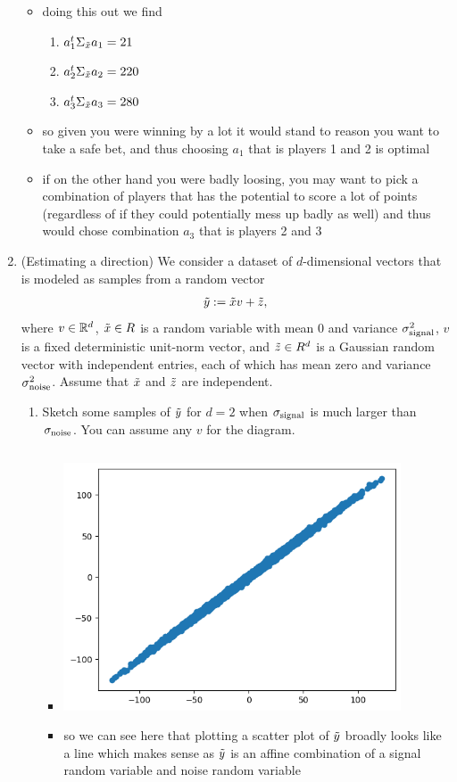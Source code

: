 \documentclass[12pt,twoside]{article}
\begin{document}
\begin{enumerate}
\begin{itemize}
\item doing this out we find 
\begin{enumerate}
  \item $a_{1}^t\Sigma_{\Tilde{x}}a_{1}=21$
  \item $a_{2}^t\Sigma_{\Tilde{x}}a_{2}=220$
  \item $a_{3}^t\Sigma_{\Tilde{x}}a_{3}=280$
\end{enumerate}
\item so given you were winning by a lot it would stand to reason you want to take a safe bet, and thus choosing $a_1$ that is players 1 and 2 is optimal
\item if on the other hand you were badly loosing, you may want to pick a combination of players that has the potential to score a lot of points (regardless of if they could potentially mess up badly as well) and thus would chose combination $a_3$ that is players 2 and 3  
\end{itemize}
\newpage


\item (Estimating a direction) We consider a dataset of $d$-dimensional vectors that is modeled as samples from a random vector
\begin{align}
\tilde{  y } := \tilde{ x }v + \tilde{  z },
\end{align}
where $v \in \mathbb{R}^d$, $\tilde{ x } \in R$ is a random variable with mean 0 and variance $\sigma_{\operatorname{signal}}^2$, $v$ is a fixed deterministic unit-norm vector, and $\tilde{  z } \in R^d$ is a Gaussian random vector with independent entries, each of which has mean zero and variance $\sigma_{\operatorname{noise}}^2$. Assume that $\tilde{ x }$ and $\tilde{  z }$ are independent.
\begin{enumerate}
\item Sketch some samples of $\tilde{  y }$ for $d=2$ when $\sigma_{\operatorname{signal}}$ is much larger than $\sigma_{\operatorname{noise}}$. You can assume any $v$ for the diagram.  
\begin{itemize}
    \color{blue}
    \item \inputminted[firstline=67, lastline=78, breaklines=True]{python}{hw8.py}
    \includegraphics[width=10cm]{homework/homework_8/images/h8_2.png}
    \item so we can see here that plotting a scatter plot of $\Tilde{y}$ broadly looks like a line which makes sense as $\Tilde{y}$ is an affine combination of a signal random variable and noise random variable
\end{itemize}



\end{enumerate}
\end{enumerate}
\end{document}
